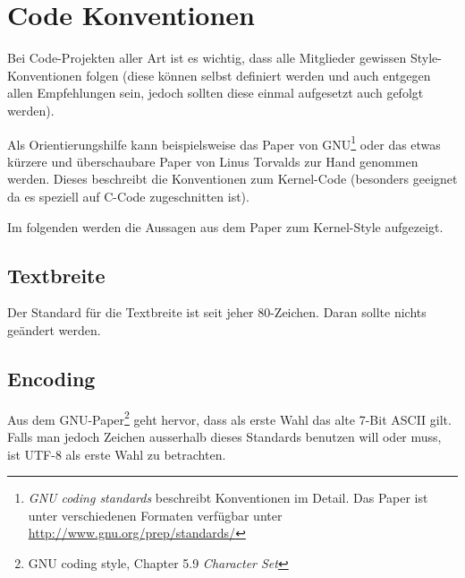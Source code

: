 



\section{Code Konventionen}
Bei Code-Projekten aller Art ist es wichtig, dass alle Mitglieder gewissen
Style-Konventionen folgen (diese können selbst definiert werden und auch
entgegen allen Empfehlungen sein, jedoch sollten diese einmal aufgesetzt
auch gefolgt werden).

Als Orientierungshilfe kann beispielsweise das Paper von GNU\footnote{
    \emph{GNU coding standards} beschreibt Konventionen im Detail.
    Das Paper ist unter verschiedenen Formaten verfügbar unter 
    \url{http://www.gnu.org/prep/standards/}}
oder das etwas kürzere und überschaubare Paper von Linus Torvalds zur 
Hand genommen werden. Dieses beschreibt die Konventionen zum Kernel-Code
(besonders geeignet da es speziell auf C-Code zugeschnitten ist).

Im folgenden werden die Aussagen aus dem Paper zum Kernel-Style
aufgezeigt.

\subsection{Textbreite}
Der Standard für die Textbreite ist seit jeher 80-Zeichen. Daran sollte
nichts geändert werden. 

\subsection{Encoding}
Aus dem GNU-Paper\footnote{
    GNU coding style, Chapter 5.9 \emph{Character Set}}
geht hervor, dass als erste Wahl das alte 7-Bit ASCII
gilt. Falls man jedoch Zeichen ausserhalb dieses Standards benutzen will
oder muss, ist UTF-8 als erste Wahl zu betrachten.

